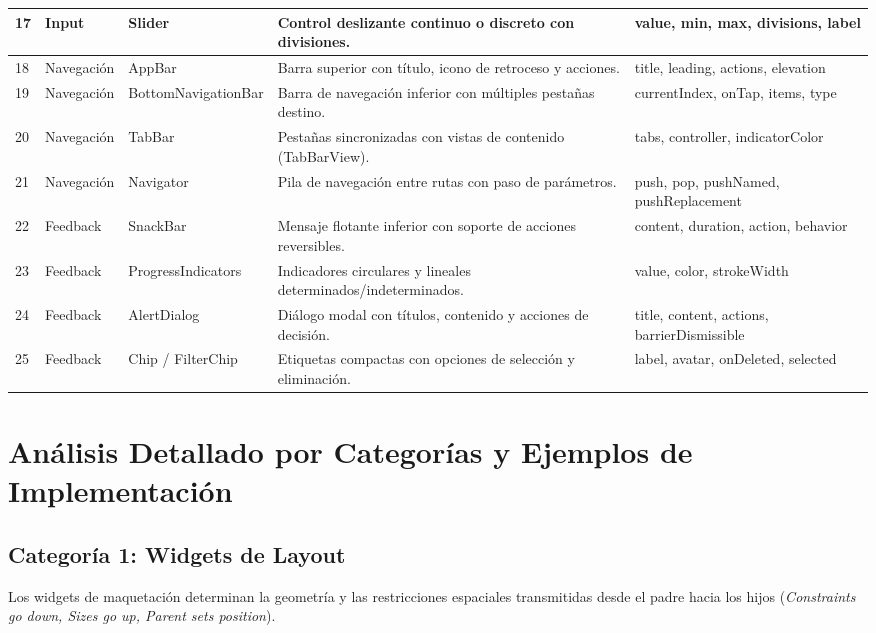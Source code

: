 \documentclass[12pt,a4paper]{article}
\begin{document}
\begin{small}
\begin{longtable}{|p{0.8cm}|p{2.2cm}|p{2.3cm}|p{5.5cm}|p{3.5cm}|}
17 & Input & Slider & Control deslizante continuo o discreto con divisiones. & value, min, max, divisions, label \\ \hline
18 & Navegación & AppBar & Barra superior con título, icono de retroceso y acciones. & title, leading, actions, elevation \\ \hline
19 & Navegación & BottomNavigationBar & Barra de navegación inferior con múltiples pestañas destino. & currentIndex, onTap, items, type \\ \hline
20 & Navegación & TabBar & Pestañas sincronizadas con vistas de contenido (TabBarView). & tabs, controller, indicatorColor \\ \hline
21 & Navegación & Navigator & Pila de navegación entre rutas con paso de parámetros. & push, pop, pushNamed, pushReplacement \\ \hline
22 & Feedback & SnackBar & Mensaje flotante inferior con soporte de acciones reversibles. & content, duration, action, behavior \\ \hline
23 & Feedback & ProgressIndicators & Indicadores circulares y lineales determinados/indeterminados. & value, color, strokeWidth \\ \hline
24 & Feedback & AlertDialog & Diálogo modal con títulos, contenido y acciones de decisión. & title, content, actions, barrierDismissible \\ \hline
25 & Feedback & Chip / FilterChip & Etiquetas compactas con opciones de selección y eliminación. & label, avatar, onDeleted, selected \\ \hline
\end{longtable}
\end{small}

\section{Análisis Detallado por Categorías y Ejemplos de Implementación}

\subsection{Categoría 1: Widgets de Layout}
Los widgets de maquetación determinan la geometría y las restricciones espaciales transmitidas desde el padre hacia los hijos (\textit{Constraints go down, Sizes go up, Parent sets position}).
\end{document}
